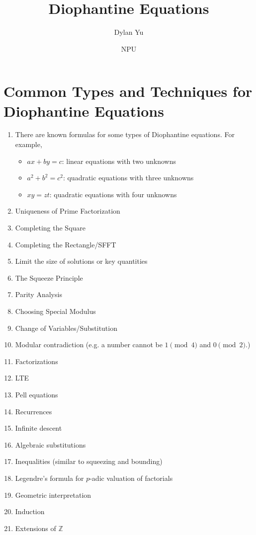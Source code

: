 \documentclass{article}
\title{Diophantine Equations}
\author{Dylan Yu}
\date{NPU}
\begin{document}
\maketitle

\section{Common Types and Techniques for Diophantine Equations}
\begin{enumerate}
    \item There are known formulas for some types of Diophantine equations. For example,
    \begin{itemize}
        \item $ax+by=c$: linear equations with two unknowns
        \item $a^2+b^2=c^2$: quadratic equations with three unknowns
        \item $xy=zt$: quadratic equations with four unknowns
    \end{itemize}
    \item Uniqueness of Prime Factorization
    \item Completing the Square
    \item Completing the Rectangle/SFFT
    \item Limit the size of solutions or key quantities
    \item The Squeeze Principle
    \item Parity Analysis
    \item Choosing Special Modulus
    \item Change of Variables/Substitution
    \item Modular contradiction (e.g. a number cannot be $1\pmod{4}$ and $0\pmod{2}$.)
    \item Factorizations
    \item LTE
    \item Pell equations
    \item Recurrences
    \item Infinite descent
    \item Algebraic substitutions
    \item Inequalities (similar to squeezing and bounding)
    \item Legendre's formula for $p$-adic valuation of factorials
    \item Geometric interpretation
    \item Induction
    \item Extensions of $\mathbb{Z}$
\end{enumerate}
\end{document}
